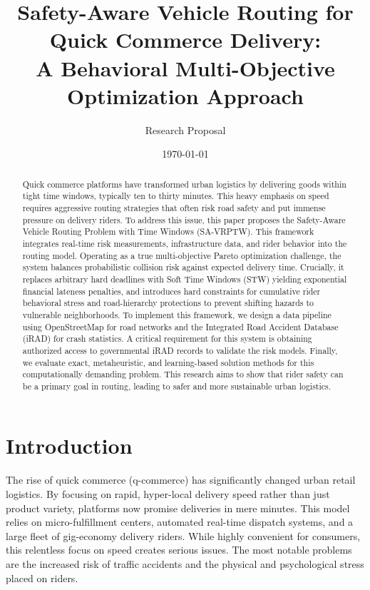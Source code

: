 \documentclass[10pt,twocolumn,letterpaper]{article}
\title{\textbf{Safety-Aware Vehicle Routing for Quick Commerce Delivery: \\ A Behavioral Multi-Objective Optimization Approach}}
\author{Research Proposal}
\date{\today}
\begin{document}
\maketitle

\begin{abstract}
Quick commerce platforms have transformed urban logistics by delivering goods within tight time windows, typically ten to thirty minutes. This heavy emphasis on speed requires aggressive routing strategies that often risk road safety and put immense pressure on delivery riders. To address this issue, this paper proposes the Safety-Aware Vehicle Routing Problem with Time Windows (SA-VRPTW). This framework integrates real-time risk measurements, infrastructure data, and rider behavior into the routing model. Operating as a true multi-objective Pareto optimization challenge, the system balances probabilistic collision risk against expected delivery time. Crucially, it replaces arbitrary hard deadlines with Soft Time Windows (STW) yielding exponential financial lateness penalties, and introduces hard constraints for cumulative rider behavioral stress and road-hierarchy protections to prevent shifting hazards to vulnerable neighborhoods. To implement this framework, we design a data pipeline using OpenStreetMap for road networks and the Integrated Road Accident Database (iRAD) for crash statistics. A critical requirement for this system is obtaining authorized access to governmental iRAD records to validate the risk models. Finally, we evaluate exact, metaheuristic, and learning-based solution methods for this computationally demanding problem. This research aims to show that rider safety can be a primary goal in routing, leading to safer and more sustainable urban logistics.
\end{abstract}

\section{Introduction}

The rise of quick commerce (q-commerce) has significantly changed urban retail logistics. By focusing on rapid, hyper-local delivery speed rather than just product variety, platforms now promise deliveries in mere minutes. This model relies on micro-fulfillment centers, automated real-time dispatch systems, and a large fleet of gig-economy delivery riders. While highly convenient for consumers, this relentless focus on speed creates serious issues. The most notable problems are the increased risk of traffic accidents and the physical and psychological stress placed on riders.
\end{document}
